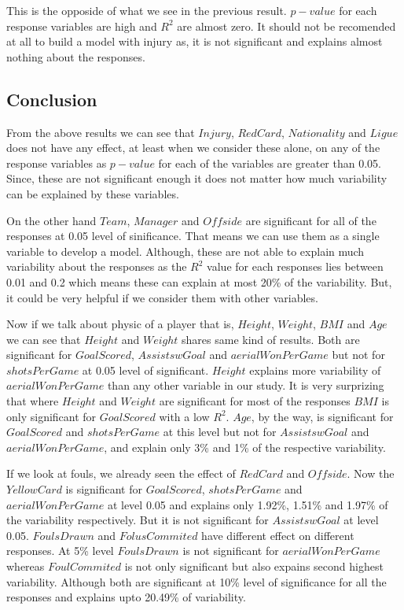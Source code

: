 \documentclass[12pt]{article}
\begin{document}
This is the opposide of what we see in the previous result. $ p-value $ for each response variables are high and $ R^2 $ are almost zero. It should not be recomended at all to build a model with injury as, it is not significant and explains almost nothing about the responses.

\newpage

\subsection{Conclusion}
From the above results we can see that $ Injury $, $ Red Card$, $ Nationality $ and $ Ligue $ does not have any effect, at least when we consider these alone, on any of the response variables as $ p-value $ for each of the variables are greater than 0.05. Since, these are not significant enough it does not matter how much variability can be explained by these variables.

On the other hand $ Team $, $ Manager $ and $ Offside $ are significant for all of the responses at 0.05 level of sinificance. That means we can use them as a single variable to develop a model. Although, these  are not able to explain much variability about the responses as the $ R^2 $ value for each responses lies between 0.01 and 0.2 which means these can explain at most 20\% of the variability. But, it could be very helpful if we consider them with other variables.

Now if we talk about physic of a player that is, $ Height $, $ Weight $, $ BMI $ and $ Age $ we can see that $ Height $ and $ Weight $ shares same kind of results. Both are significant for $ GoalScored $, $ AssistswGoal $ and $ aerialWonPerGame $ but not for $ shotsPerGame $ at 0.05 level of significant. $ Height $ explains more variability of $ aerialWonPerGame $ than any other variable in our study. It is very surprizing that where $ Height $ and $ Weight $ are significant for most of the responses $ BMI $ is only significant for $ GoalScored $ with a low $ R^2 $. $ Age $, by the way, is significant for $ GoalScored $ and $ shotsPerGame $ at this level but not for $ AssistswGoal $ and $ aerialWonPerGame $, and explain only 3\% and 1\% of the respective variability.

If we look at fouls, we already seen the effect of $ RedCard $ and $ Offside $. Now the $ YellowCard $ is significant for $ GoalScored $, $ shotsPerGame $ and $ aerialWonPerGame $ at level 0.05 and explains only 1.92\%, 1.51\% and 1.97\% of the variability respectively. But it is not significant for $ AssistswGoal$ at level 0.05. $ FoulsDrawn $ and $ FolusCommited $ have different effect on different responses. At 5\% level $ FoulsDrawn $ is not significant for $ aerialWonPerGame $ whereas $ FoulCommited $ is not only significant but also expains second highest variability. Although both are significant at 10\% level of significance for all the responses and explains upto 20.49\% of variability.
\end{document}
